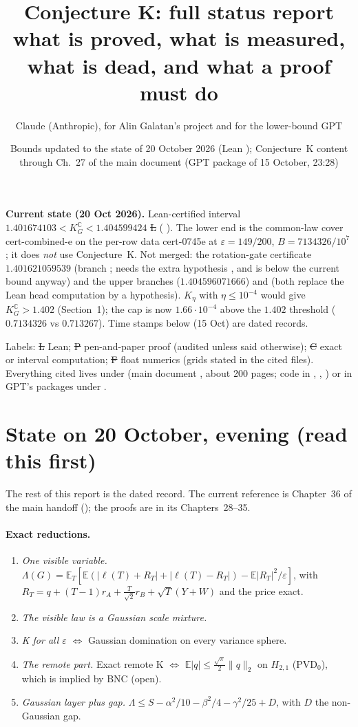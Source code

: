 \documentclass[11pt,a4paper]{article}
\title{Conjecture K: full status report\\[4pt]\large what is proved, what is measured, what is dead, and what a proof must do}
\author{Claude (Anthropic), for Alin Galatan's project and for the lower-bound GPT}
\date{Bounds updated to the state of 20 October 2026 (Lean \code{master} \code{20eb917}); Conjecture~K content through Ch.~27 of the main document (GPT package of 15 October, 23:28)}
\newcommand{\C}{\mathbb{C}}\newcommand{\R}{\mathbb{R}}\newcommand{\E}{\mathbb{E}}\newcommand{\Hc}[2]{H_{#1,#2}}
\begin{document}
\maketitle
\noindent\textbf{Current state (20 Oct 2026).} Lean-certified interval $1.401674103<K_G^{\C}<1.404599424$ \st{L} ( ). The lower end is the common-law cover
cert-combined-e on the per-row data cert-0745e at $\varepsilon=149/200$, $B=7134326/10^7$; it does \emph{not} use Conjecture~K. Not merged: the rotation-gate certificate $1.401621059539$
(branch ; needs the extra hypothesis , and is below the current bound anyway) and the upper branches  ($1.404596071666$) and
 (both replace the Lean head computation by a  hypothesis). $K_\eta$ with $\eta\le10^{-4}$ would give $K_G^{\C}>1.402$ (Section~1); the cap is now
$1.66\cdot10^{-4}$ above the $1.402$ threshold ($0.7134326$ vs $0.713267$). Time stamps below (15 Oct) are dated records.

\noindent Labels: \st{L} Lean; \st{P} pen-and-paper proof (audited unless said otherwise); \st{C} exact or interval computation; \st{F} float numerics (grids stated in the cited files). Everything cited lives under
 (main document , about 200 pages; code in ,
, ) or in GPT's packages under .

\section{State on 20 October, evening (read this first)}\label{sec:state2010}
The rest of this report is the dated record. The current reference is Chapter~36 of the main handoff (); the proofs are in its Chapters~28--35.
\paragraph{Exact reductions.}
\begin{enumerate}
\item \emph{One visible variable.} $\Lambda(G)=\E_T[\E(|\ell(T)+R_T|+|\ell(T)-R_T|)-\E|R_T|^2/\varepsilon]$, with $R_T=q+(T-1)r_A+\tfrac T{\sqrt2}r_B+\sqrt T(Y+W)$ and the
price exact.
\item \emph{The visible law is a Gaussian scale mixture.}
\item \emph{K for all $\varepsilon$} $\iff$ Gaussian domination on every variance sphere.
\item \emph{The remote part.} Exact remote K $\iff$ $\E|q|\le\frac{\sqrt\pi}2\|q\|_2$ on $\Hc21$ (PVD$_0$), which is implied by BNC (open).
\item \emph{Gaussian layer plus gap.} $\Lambda\le S-\alpha^2/10-\beta^2/4-\gamma^2/25+D$, with $D$ the non-Gaussian gap.
\end{enumerate}
\end{document}
